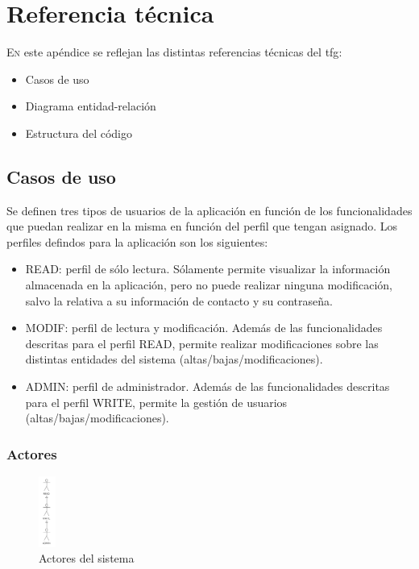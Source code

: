 \chapter{Referencia técnica}
\label{chap:ref-tecnica}

\lettrine{E}{n} este apéndice se reflejan las distintas referencias técnicas del \acrshort{tfg}:

\begin{itemize}
\item Casos de uso
\item Diagrama entidad-relación
\item Estructura del código
\end{itemize}

\section{Casos de uso}
\label{chap:casos-uso}

Se definen tres tipos de usuarios de la aplicación en función de los funcionalidades que puedan realizar en la misma en función del perfil que tengan asignado. Los perfiles defindos para la aplicación son los siguientes:

\begin{itemize}
\item READ: perfil de sólo lectura. Sólamente permite visualizar la información almacenada en la aplicación, pero no puede realizar ninguna modificación, salvo la relativa a su información de contacto y su contraseña.
\item MODIF: perfil de lectura y modificación. Además de las funcionalidades descritas para el perfil READ, permite realizar modificaciones sobre las distintas entidades del sistema (altas/bajas/modificaciones).
\item ADMIN: perfil de administrador. Además de las funcionalidades descritas para el perfil WRITE, permite la gestión de usuarios (altas/bajas/modificaciones).
\end{itemize}


\subsection{Actores}
\label{sub:actores}


\begin{figure}[hp!]
  \centering
  \includegraphics[width=0.05\textwidth]{imaxes/actores.png}
  \caption{Actores del sistema}
  \label{fig:actores}
\end{figure}

